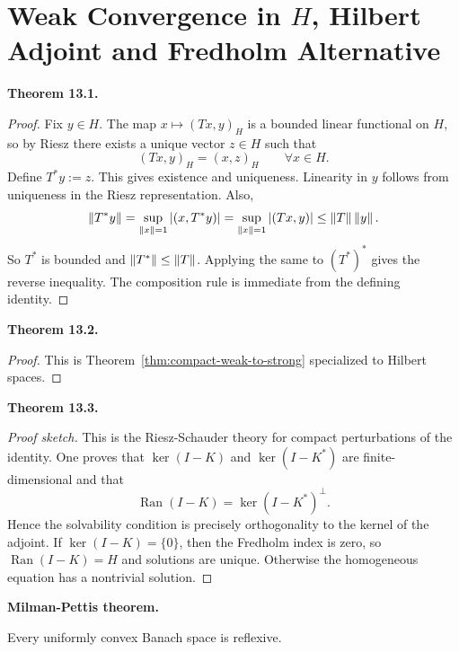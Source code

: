 \documentclass[11pt]{article}
\newenvironment{theoremstmt}[1]{%
  \par\medskip\noindent\textbf{Theorem #1. }\itshape
}{\par\medskip}
\newenvironment{namedstmt}[1]{%
  \par\medskip\noindent\textbf{#1. }\itshape
}{\par\medskip}
\begin{document}
\section{Weak Convergence in \texorpdfstring{$H$}{H}, Hilbert Adjoint and Fredholm Alternative}

\begin{theoremstmt}{13.1}
\thmHilbertAdjoint
\end{theoremstmt}

\begin{proof}
Fix $y\in H$. The map $x\mapsto (Tx,y)_H$ is a bounded linear functional on $H$, so by Riesz there exists a unique vector $z\in H$ such that
\[
(Tx,y)_H=(x,z)_H \qquad \forall x\in H.
\]
Define $T^*y:=z$. This gives existence and uniqueness. Linearity in $y$ follows from uniqueness in the Riesz representation. Also,
\[
\left\lVert T^*y\right\rVert=
\sup_{\left\lVert x\right\rVert=1}\left\lvert (x,T^*y)\right\rvert=
\sup_{\left\lVert x\right\rVert=1}\left\lvert (Tx,y)\right\rvert
\le \left\lVert T\right\rVert\left\lVert y\right\rVert.
\]
So $T^*$ is bounded and $\left\lVert T^*\right\rVert\le \left\lVert T\right\rVert$. Applying the same to $(T^*)^*$ gives the reverse inequality. The composition rule is immediate from the defining identity.
\end{proof}

\begin{theoremstmt}{13.2}
\thmCompactWeakToStrongHilbert
\end{theoremstmt}

\begin{proof}
This is Theorem~\ref{thm:compact-weak-to-strong} specialized to Hilbert spaces.
\end{proof}

\begin{theoremstmt}{13.3}
\thmFredholmAlternative
\end{theoremstmt}

\begin{proof}[Proof sketch]
This is the Riesz-Schauder theory for compact perturbations of the identity. One proves that $\ker(I-K)$ and $\ker(I-K^*)$ are finite-dimensional and that
\[
\operatorname{Ran}(I-K)=\ker(I-K^*)^{\perp}.
\]
Hence the solvability condition is precisely orthogonality to the kernel of the adjoint. If $\ker(I-K)=\{0\}$, then the Fredholm index is zero, so $\operatorname{Ran}(I-K)=H$ and solutions are unique. Otherwise the homogeneous equation has a nontrivial solution.
\end{proof}

\begin{namedstmt}{Milman-Pettis theorem}
Every uniformly convex Banach space is reflexive.
\end{namedstmt}
\end{document}

